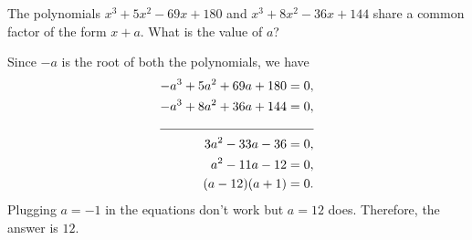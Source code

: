\documentclass[11pt,twoside]{scrartcl}
\begin{document}
\begin{problem}
    The polynomials $ x^3+5x^2-69x+180 $ and $ x^3+8x^2-36x+144 $ share a common
factor of the form $ x + a $. What is the value of $ a $?
    \begin{sketch}
        Since $-a$ is the root of both the polynomials, we have 
        \begin{align*}
            -a^3 + 5a^2 + 69a + 180 &= 0, \\
            -a^3 + 8a^2 + 36a + 144 &= 0, \\
            \cline{1-2}
            3a^2 -33a - 36 &= 0, \\
            a^2 - 11a - 12 &= 0, \\
            (a - 12)(a + 1) &= 0.
        \end{align*}
        Plugging $a=-1$ in the equations don't work but $a=12$ does. Therefore, the answer is $\boxed{12}.$
    \end{sketch}
\end{problem}
\end{document}

